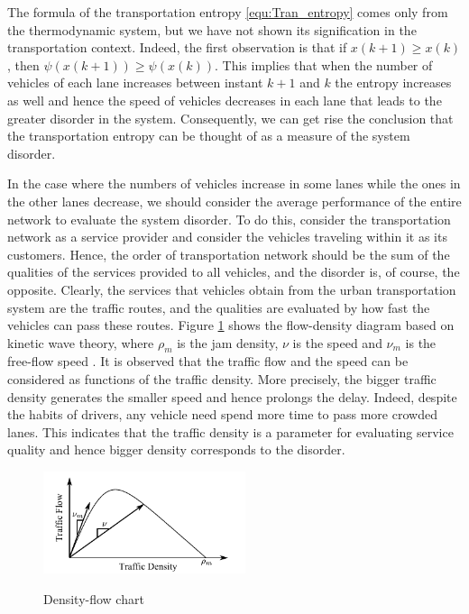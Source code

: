 \documentclass[trsc,nonblindrev]{informs3} %
\renewcommand{\vec}[1]{#1}
\begin{document}
The formula of the transportation entropy \eqref{equ:Tran_entropy}
comes only from the thermodynamic system, but we have not shown its
signification in the transportation context. Indeed, the first observation 
  is that if $\vec{x}(k+1)\geq \vec{x}(k)$, then $\psi(\vec{x}(k+1))\geq \psi(\vec{x}(k))$. This implies that 
  when the number of
vehicles of each lane increases between instant $k+1$ and $k$ the entropy  increases as well and hence  the speed of vehicles decreases in each lane that leads to the
greater disorder in the system. Consequently, we can get rise the conclusion that
 the transportation entropy can be thought of as a measure of the system
disorder.

In the case where the numbers of vehicles increase in some lanes while
the ones in the other lanes decrease, we should consider the average
performance of  the entire network to evaluate the
system disorder.
To do this, consider the
transportation network as a service provider and consider the
vehicles traveling within it as its customers. Hence, the order of
transportation network should be the sum of the qualities of the
services provided to all vehicles, and the disorder is, of course,
the opposite. Clearly, the services that vehicles obtain from the
urban transportation system are the traffic routes, and the qualities
are evaluated by how fast the vehicles can pass these routes. Figure
\ref{fig:d_q} shows the flow-density diagram based on kinetic wave
theory, where $\rho_m$ is the jam density, $\nu$ is the speed and
$\nu_m$ is the free-flow speed \citep{ukkusuri_robust_2010}. It is
observed that the traffic flow and the speed can be considered as
functions of the traffic density. More precisely, the bigger traffic
density generates the smaller speed and hence prolongs the delay.
Indeed, despite the habits of drivers, any vehicle need spend more
time to pass more crowded lanes. This indicates that the traffic
density is a parameter for evaluating service quality and hence
bigger density corresponds to the disorder.

\begin{figure}[ht]
  \centering
  \includegraphics[height=3cm]{pics/d-q}\\
  \caption{Density-flow chart}
  \label{fig:d_q}
\end{figure}
\end{document}
